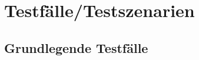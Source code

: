 \documentclass[a4paper,12pt]{article}
\begin{document}
\begin{center}
\end{center}

\clearpage

\clearpage
\section{Testfälle/Testszenarien}
\subsection{Grundlegende Testfälle}
\end{document}
